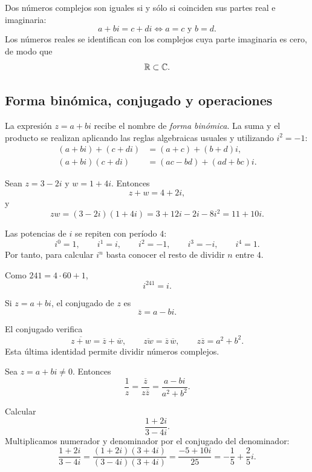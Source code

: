 Dos números complejos son iguales si y sólo si coinciden sus partes real e imaginaria:
\[
a+bi=c+di\Longleftrightarrow a=c\text{ y }b=d.
\]
Los números reales se identifican con los complejos cuya parte imaginaria es cero, de modo que
\[
\mathbb{R}\subset\mathbb{C}.
\]

\subsection{Forma binómica, conjugado y operaciones}

La expresión \(z=a+bi\) recibe el nombre de \emph{forma binómica}. La suma y el producto se realizan aplicando las reglas algebraicas usuales y utilizando \(i^2=-1\):
\begin{align*}
(a+bi)+(c+di)&=(a+c)+(b+d)i,\\
(a+bi)(c+di)&=(ac-bd)+(ad+bc)i.
\end{align*}

\begin{example}
Sean \(z=3-2i\) y \(w=1+4i\). Entonces
\[
z+w=4+2i,
\]
y
\[
zw=(3-2i)(1+4i)=3+12i-2i-8i^2=11+10i.
\]
\end{example}

Las potencias de \(i\) se repiten con período \(4\):
\[
i^0=1,\qquad i^1=i,\qquad i^2=-1,\qquad i^3=-i,\qquad i^4=1.
\]
Por tanto, para calcular \(i^n\) basta conocer el resto de dividir \(n\) entre \(4\).

\begin{example}
Como \(241=4\cdot60+1\),
\[
i^{241}=i.
\]
\end{example}

\begin{definition}[Conjugado]
Si \(z=a+bi\), el conjugado de \(z\) es
\[
\overline{z}=a-bi.
\]
\end{definition}

El conjugado verifica
\[
\overline{z+w}=\overline z+\overline w,
\qquad
\overline{zw}=\overline z\,\overline w,
\qquad
z\overline z=a^2+b^2.
\]
Esta última identidad permite dividir números complejos.

\begin{proposition}
Sea \(z=a+bi\neq0\). Entonces
\[
\frac1z=\frac{\overline z}{z\overline z}
=\frac{a-bi}{a^2+b^2}.
\]
\end{proposition}

\begin{example}
Calcular
\[
\frac{1+2i}{3-4i}.
\]
Multiplicamos numerador y denominador por el conjugado del denominador:
\[
\frac{1+2i}{3-4i}
=\frac{(1+2i)(3+4i)}{(3-4i)(3+4i)}
=\frac{-5+10i}{25}
=-\frac15+\frac25i.
\]
\end{example}


